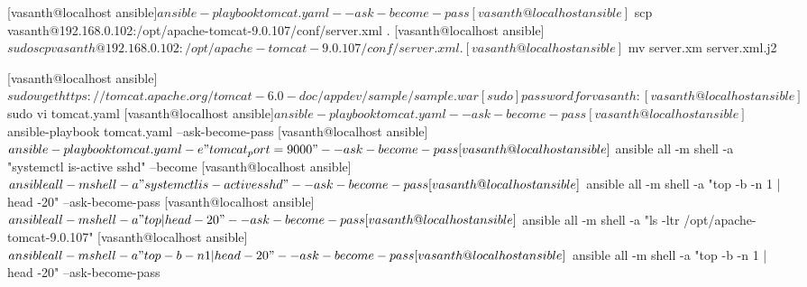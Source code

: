 [vasanth@localhost ansible]$ ansible-playbook tomcat.yaml --ask-become-pass
[vasanth@localhost ansible]$ scp vasanth@192.168.0.102:/opt/apache-tomcat-9.0.107/conf/server.xml .
[vasanth@localhost ansible]$ sudo scp vasanth@192.168.0.102:/opt/apache-tomcat-9.0.107/conf/server.xml .
[vasanth@localhost ansible]$ mv server.xm server.xml.j2

[vasanth@localhost ansible]$ sudo wget https://tomcat.apache.org/tomcat-6.0-doc/appdev/sample/sample.war
[sudo] password for vasanth:

[vasanth@localhost ansible]$ sudo vi tomcat.yaml
[vasanth@localhost ansible]$ ansible-playbook tomcat.yaml --ask-become-pass
[vasanth@localhost ansible]$ ansible-playbook tomcat.yaml --ask-become-pass
[vasanth@localhost ansible]$ ansible-playbook tomcat.yaml -e "tomcat_port=9000" --ask-become-pass

[vasanth@localhost ansible]$ ansible all -m shell -a "systemctl is-active sshd" --become
[vasanth@localhost ansible]$ ansible all -m shell -a "systemctl is-active sshd" --ask-become-pass
[vasanth@localhost ansible]$ ansible all -m shell -a "top -b -n 1 | head -20" --ask-become-pass
[vasanth@localhost ansible]$ ansible all -m shell -a "top  | head -20" --ask-become-pass

[vasanth@localhost ansible]$ ansible all -m shell -a "ls -ltr /opt/apache-tomcat-9.0.107"
[vasanth@localhost ansible]$ ansible all -m shell -a "top -b -n 1 | head -20" --ask-become-pass
[vasanth@localhost ansible]$ ansible all -m shell -a "top -b -n 1 | head -20" --ask-become-pass

